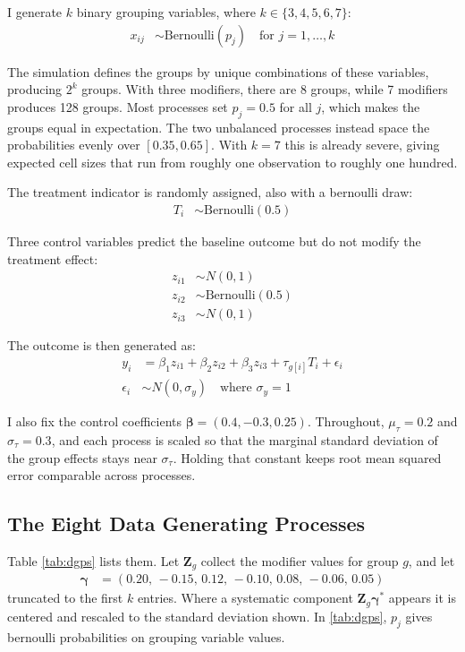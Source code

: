 \documentclass[12pt]{article}
\begin{document}
I generate $k$ binary grouping variables, where $k \in \{3, 4, 5, 6, 7\}$:
\begin{align*}
x_{ij} &\sim \text{Bernoulli}(p_j) \quad \text{for } j = 1, \ldots, k
\end{align*}

The simulation defines the groups by unique combinations of these variables, producing $2^k$ groups.
With three modifiers, there are 8 groups, while 7 modifiers produces 128 groups.
Most processes set $p_j = 0.5$ for all $j$, which makes the groups equal in expectation.
The two unbalanced processes instead space the probabilities evenly over $[0.35, 0.65]$. With $k = 7$ this is already severe, giving expected cell sizes that run from roughly one observation to roughly one hundred.


The treatment indicator is randomly assigned, also with a bernoulli draw:
\begin{align*}
T_i &\sim \text{Bernoulli}(0.5)
\end{align*}

Three control variables predict the baseline outcome but do not modify the treatment effect:
\begin{align*}
z_{i1} &\sim N(0, 1) \\
z_{i2} &\sim \text{Bernoulli}(0.5) \\
z_{i3} &\sim N(0, 1)
\end{align*}

The outcome is then generated as:
\begin{align*}
y_i &= \beta_1 z_{i1} + \beta_2 z_{i2} + \beta_3 z_{i3} + \tau_{g[i]} T_i + \epsilon_i \\
\epsilon_i &\sim N(0, \sigma_y) \quad \text{where } \sigma_y = 1
\end{align*}

I also fix the control coefficients $\boldsymbol{\beta} = (0.4, -0.3, 0.25)$.
Throughout, $\mu_\tau = 0.2$ and $\sigma_\tau = 0.3$, and each process is scaled so that the marginal standard deviation of the group effects stays near $\sigma_\tau$.
Holding that constant keeps root mean squared error comparable across processes.

\subsection{The Eight Data Generating Processes}

Table \ref{tab:dgps} lists them.
Let $\mathbf{Z}_g$ collect the modifier values for group $g$, and let
\begin{align*}
\boldsymbol{\gamma} &= (0.20,\, -0.15,\, 0.12,\, -0.10,\, 0.08,\, -0.06,\, 0.05)
\end{align*}
truncated to the first $k$ entries.
Where a systematic component $\mathbf{Z}_g\boldsymbol{\gamma}^*$ appears it is centered and rescaled to the standard deviation shown.
In \ref{tab:dgps}, $p_j$ gives bernoulli probabilities on grouping variable values.
\end{document}

